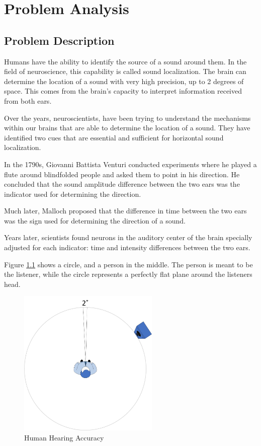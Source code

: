 \chapter{Problem Analysis}\label{ch:problemAnalysis}
\section{Problem Description}
Humans have the ability to identify the source of a sound around them. In the 
field of neuroscience, this capability is called sound localization. The brain
can determine the location of a sound with very high precision, up to 2 degrees 
of space. This comes from the brain's capacity to interpret information received
from both ears.\cite{HUMANSOUNDS2}

Over the years, neuroscientists, have been trying to understand the mechanisms 
within our brains that are able to determine the location of a sound. They have 
identified two cues that are essential and sufficient for horizontal sound
localization.

In the 1790s, Giovanni Battista Venturi conducted experiments where he played a 
flute around blindfolded people and asked them to point in his direction. 
He concluded that the sound amplitude difference between the two ears was the 
indicator used for determining the direction.

Much later, Malloch proposed that the difference in time between the two ears 
was the sign used for determining the direction of a sound.

Years later, scientists found neurons in the auditory center of the brain
specially adjusted for each indicator: time and intensity differences between 
the two ears.\cite{HUMANSOUNDS}

\newpage

Figure \ref{fig:humanHearingAccuracy} shows a circle, and a person in the middle. 
The person is meant to be the listener, while the circle represents a perfectly 
flat plane around the listeners head.
 
\begin{figure}[htp]
	\centering
	\includegraphics[width = 0.6\textwidth]{Illustrations/personHearingAccuracy.jpg}
	\caption{Human Hearing Accuracy}
	\label{fig:humanHearingAccuracy}
\end{figure}

